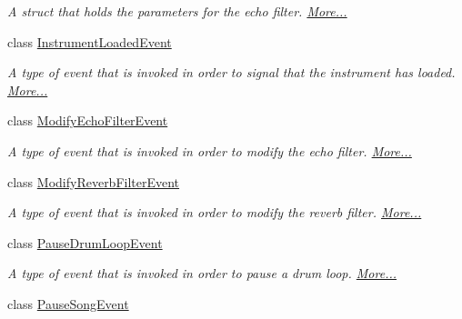 \begin{DoxyCompactItemize}
\begin{DoxyCompactList}\small\item\em A struct that holds the parameters for the echo filter.  \hyperlink{group__filter_params_struct_virtual_instrument_manager_1_1_echo_filter_parameters}{More...}\end{DoxyCompactList}\item 
class \hyperlink{group___v_i_m_event_types_class_virtual_instrument_manager_1_1_instrument_loaded_event}{Instrument\+Loaded\+Event}
\begin{DoxyCompactList}\small\item\em A type of event that is invoked in order to signal that the instrument has loaded.  \hyperlink{group___v_i_m_event_types_class_virtual_instrument_manager_1_1_instrument_loaded_event}{More...}\end{DoxyCompactList}\item 
class \hyperlink{group___v_i_m_event_types_class_virtual_instrument_manager_1_1_modify_echo_filter_event}{Modify\+Echo\+Filter\+Event}
\begin{DoxyCompactList}\small\item\em A type of event that is invoked in order to modify the echo filter.  \hyperlink{group___v_i_m_event_types_class_virtual_instrument_manager_1_1_modify_echo_filter_event}{More...}\end{DoxyCompactList}\item 
class \hyperlink{group___v_i_m_event_types_class_virtual_instrument_manager_1_1_modify_reverb_filter_event}{Modify\+Reverb\+Filter\+Event}
\begin{DoxyCompactList}\small\item\em A type of event that is invoked in order to modify the reverb filter.  \hyperlink{group___v_i_m_event_types_class_virtual_instrument_manager_1_1_modify_reverb_filter_event}{More...}\end{DoxyCompactList}\item 
class \hyperlink{group___v_i_m_event_types_class_virtual_instrument_manager_1_1_pause_drum_loop_event}{Pause\+Drum\+Loop\+Event}
\begin{DoxyCompactList}\small\item\em A type of event that is invoked in order to pause a drum loop.  \hyperlink{group___v_i_m_event_types_class_virtual_instrument_manager_1_1_pause_drum_loop_event}{More...}\end{DoxyCompactList}\item 
class \hyperlink{group___v_i_m_event_types_class_virtual_instrument_manager_1_1_pause_song_event}{Pause\+Song\+Event}

\end{DoxyCompactItemize}
